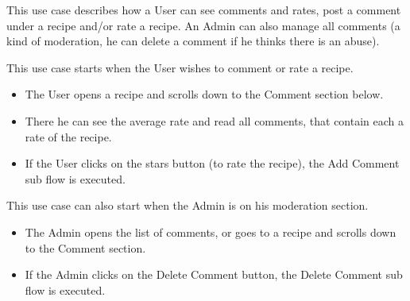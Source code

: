 {
  This use case describes how a User can see comments and rates, post a comment under a recipe and/or rate a recipe. An Admin can also manage all comments (a kind of moderation, he can delete a comment if he thinks there is an abuse).

}
{
  \begin{multicols}{2}
    This use case starts when the User wishes to comment or rate a recipe.
    \begin{itemize}
      \item The User opens a recipe and scrolls down to the Comment section below.
      \item There he can see the average rate and read all comments, that contain each a rate of the recipe.
      \item If the User clicks on the stars button (to rate the recipe), the Add Comment sub flow is executed.
    \end{itemize}

    \columnbreak
  
    This use case can also start when the Admin is on his moderation section.
    \begin{itemize}
      \item The Admin opens the list of comments, or goes to a recipe and scrolls down to the Comment section.
      \item If the Admin clicks on the Delete Comment button, the Delete Comment sub flow is executed.
    \end{itemize}
  \end{multicols}

}
